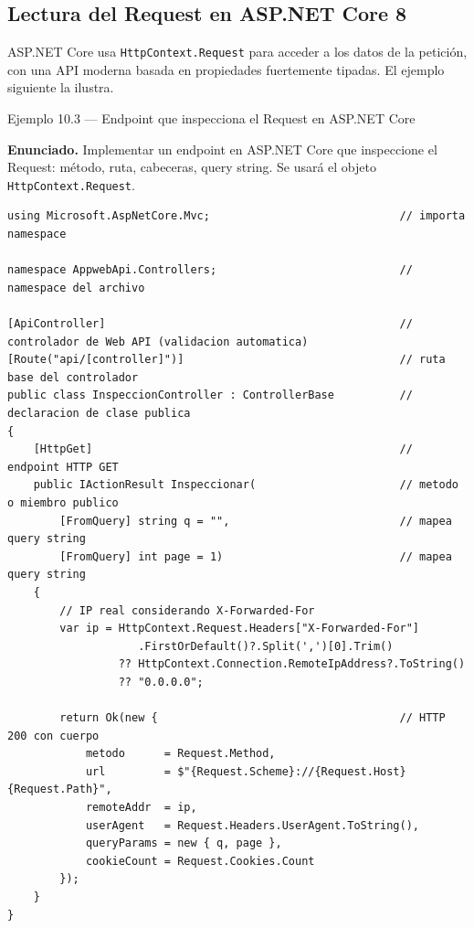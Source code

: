\documentclass[11pt,a4paper,openany]{book}
\begin{document}
\subsection{Lectura del Request en ASP.NET Core 8}

ASP.NET Core usa \texttt{HttpContext.Request} para acceder a
los datos de la petición, con una API moderna basada en propiedades
fuertemente tipadas. El ejemplo siguiente la ilustra.


\begin{cajaejemplo}{Ejemplo 10.3 --- Endpoint que inspecciona el Request en ASP.NET Core}

\textbf{Enunciado.} Implementar un endpoint en ASP.NET Core que inspeccione el Request: método, ruta, cabeceras, query string. Se usará el objeto \texttt{HttpContext.Request}.

\begin{lstlisting}[style=cs,caption={Controllers/InspeccionController.cs},label=lst:10.6]
using Microsoft.AspNetCore.Mvc;                             // importa namespace

namespace AppwebApi.Controllers;                            // namespace del archivo

[ApiController]                                             // controlador de Web API (validacion automatica)
[Route("api/[controller]")]                                 // ruta base del controlador
public class InspeccionController : ControllerBase          // declaracion de clase publica
{
    [HttpGet]                                               // endpoint HTTP GET
    public IActionResult Inspeccionar(                      // metodo o miembro publico
        [FromQuery] string q = "",                          // mapea query string
        [FromQuery] int page = 1)                           // mapea query string
    {
        // IP real considerando X-Forwarded-For
        var ip = HttpContext.Request.Headers["X-Forwarded-For"]
                    .FirstOrDefault()?.Split(',')[0].Trim()
                 ?? HttpContext.Connection.RemoteIpAddress?.ToString()
                 ?? "0.0.0.0";

        return Ok(new {                                     // HTTP 200 con cuerpo
            metodo      = Request.Method,
            url         = $"{Request.Scheme}://{Request.Host}{Request.Path}",
            remoteAddr  = ip,
            userAgent   = Request.Headers.UserAgent.ToString(),
            queryParams = new { q, page },
            cookieCount = Request.Cookies.Count
        });
    }
}
\end{lstlisting}
\end{cajaejemplo}
\end{document}
